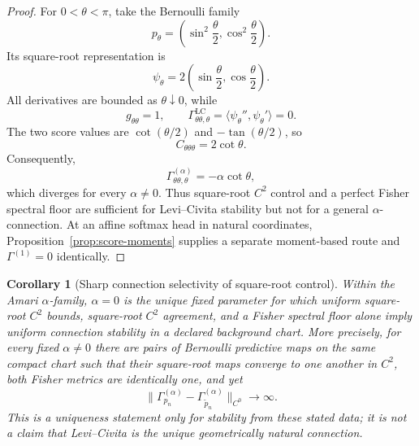 \documentclass[11pt]{article}
\newtheorem{corollary}[theorem]{Corollary}
\theoremstyle{definition}
\theoremstyle{remark}
\newcommand{\LC}{\mathrm{LC}}
\begin{document}
\begin{proof}
For $0<\theta<\pi$, take the Bernoulli family
\begin{equation}
    p_\theta
    =\left(\sin^2\frac{\theta}{2},
            \cos^2\frac{\theta}{2}\right).
\end{equation}
Its square-root representation is
\begin{equation}
    \psi_\theta
    =2\left(\sin\frac{\theta}{2},
             \cos\frac{\theta}{2}\right).
\end{equation}
All derivatives are bounded as $\theta\downarrow0$, while
\begin{equation}
    g_{\theta\theta}=1,
    \qquad
    \Gamma^{\LC}_{\theta\theta,\theta}
    =\langle\psi_\theta'',\psi_\theta'\rangle=0.
\end{equation}
The two score values are $\cot(\theta/2)$ and $-\tan(\theta/2)$, so
\begin{equation}
    C_{\theta\theta\theta}=2\cot\theta.
\end{equation}
Consequently,
\begin{equation}
    \Gamma^{(\alpha)}_{\theta\theta,\theta}
    =-\alpha\cot\theta,
\end{equation}
which diverges for every $\alpha\ne0$. Thus square-root $C^2$ control and a perfect Fisher spectral floor are sufficient for Levi--Civita stability but not for a general $\alpha$-connection. At an affine softmax head in natural coordinates, Proposition~\ref{prop:score-moments} supplies a separate moment-based route and $\Gamma^{(1)}=0$ identically.
\end{proof}

\begin{corollary}[Sharp connection selectivity of square-root control]\label{cor:alpha-zero-selectivity}
Within the Amari $\alpha$-family, $\alpha=0$ is the unique fixed parameter for which uniform square-root $C^2$ bounds, square-root $C^2$ agreement, and a Fisher spectral floor alone imply uniform connection stability in a declared background chart. More precisely, for every fixed $\alpha\ne0$ there are pairs of Bernoulli predictive maps on the same compact chart such that their square-root maps converge to one another in $C^2$, both Fisher metrics are identically one, and yet
\begin{equation}
    \|\Gamma_{p_n}^{(\alpha)}-
      \Gamma_{\widetilde p_n}^{(\alpha)}\|_{C^0}
    \longrightarrow\infty.
    \label{eq:nonzero-alpha-pair-divergence}
\end{equation}
This is a uniqueness statement only for stability from these stated data; it is not a claim that Levi--Civita is the unique geometrically natural connection.
\end{corollary}
\end{document}
